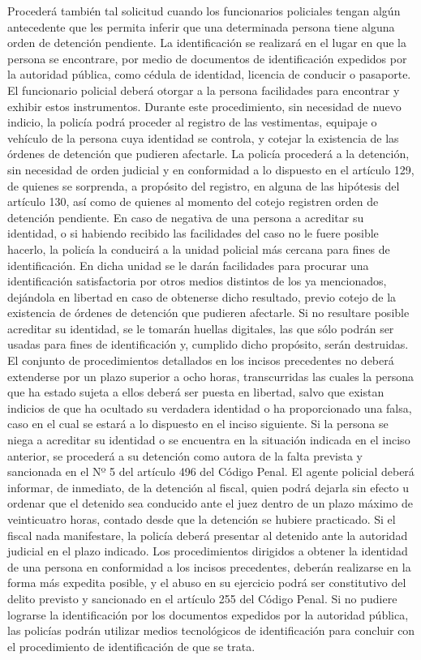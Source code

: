     Procederá también tal solicitud cuando los funcionarios policiales tengan algún antecedente que les permita inferir que una determinada persona tiene alguna orden de detención pendiente.
    La identificación se realizará en el lugar en que la persona se encontrare, por medio de documentos de identificación expedidos por la autoridad pública, como cédula de identidad, licencia de conducir o pasaporte. El funcionario policial deberá otorgar a la persona facilidades para encontrar y exhibir estos instrumentos.
    Durante este procedimiento, sin necesidad de nuevo indicio, la policía podrá proceder al registro de las vestimentas, equipaje o vehículo de la persona cuya identidad se controla, y cotejar la existencia de las órdenes de detención que pudieren afectarle. La policía procederá a la detención, sin necesidad de orden judicial y en conformidad a lo dispuesto en el artículo 129, de quienes se sorprenda, a propósito del registro, en alguna de las hipótesis del artículo 130, así como de quienes al momento del cotejo registren orden de detención pendiente.
    En caso de negativa de una persona a acreditar su identidad, o si habiendo recibido las facilidades del caso no le fuere posible hacerlo, la policía la conducirá a la unidad policial más cercana para fines de identificación. En dicha unidad se le darán facilidades para procurar una identificación satisfactoria por otros medios distintos de los ya mencionados, dejándola en libertad en caso de obtenerse dicho resultado, previo cotejo de la existencia de órdenes de detención que pudieren afectarle. Si no resultare posible acreditar su identidad, se le tomarán huellas digitales, las que sólo podrán ser usadas para fines de identificación y, cumplido dicho propósito, serán destruidas.
    El conjunto de procedimientos detallados en los incisos precedentes no deberá extenderse por un plazo superior a ocho horas, transcurridas las cuales la persona que ha estado sujeta a ellos deberá ser puesta en libertad, salvo que existan indicios de que ha ocultado su verdadera identidad o ha proporcionado una falsa, caso en el cual se estará a lo dispuesto en el inciso siguiente.
    Si la persona se niega a acreditar su identidad o se encuentra en la situación indicada en el inciso anterior, se procederá a su detención como autora de la falta prevista y sancionada en el Nº 5 del artículo 496 del Código Penal. El agente policial deberá informar, de inmediato, de la detención al fiscal, quien podrá dejarla sin efecto u ordenar que el detenido sea conducido ante el juez dentro de un plazo máximo de veinticuatro horas, contado desde que la detención se hubiere practicado. Si el fiscal nada manifestare, la policía deberá presentar al detenido ante la autoridad judicial en el plazo indicado.
    Los procedimientos dirigidos a obtener la identidad de una persona en conformidad a los incisos precedentes, deberán realizarse en la forma más expedita posible, y el abuso en su ejercicio podrá ser constitutivo del delito previsto y sancionado en el artículo 255 del Código Penal.
    Si no pudiere lograrse la identificación por los documentos expedidos por la autoridad pública, las policías podrán utilizar medios tecnológicos de identificación para concluir con el procedimiento de identificación de que se trata.




